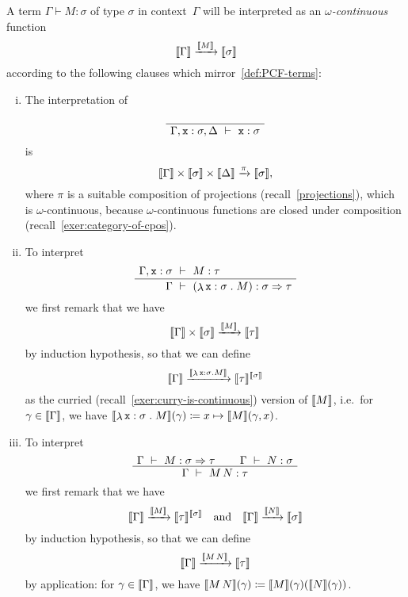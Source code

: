 \begin{definition}
  A term \(\Gamma \vdash M : \sigma\) of type \(\sigma\) in context~\(\Gamma\)
  will be interpreted as an \emph{\(\omega\)-continuous} function
  \[
    \llbracket\Gamma\rrbracket \xrightarrow{\llbracket M\rrbracket} \llbracket\sigma\rrbracket
  \]
  according to the following clauses which mirror~\cref{def:PCF-terms}:
  \begin{enumerate}[(i)]
  \item
    The interpretation of
    \[
      \def\fCenter{\ \vdash\ }
      \AxiomC{\phantom{$\fCenter$}}
      \UnaryInf$\Gamma,\var{x}:\sigma,\Delta \fCenter \var{x} : \sigma$
      \DisplayProof
    \]
    is
    \[
      \llbracket\Gamma\rrbracket \times \llbracket\sigma\rrbracket \times {\llbracket\Delta\rrbracket}
      \xrightarrow{\pi} \llbracket\sigma\rrbracket,
    \]
    where \(\pi\) is a suitable composition of projections
    (recall~\cref{projections}), which is \(\omega\)-continuous, because
    \(\omega\)-continuous functions are closed under composition
    (recall~\cref{exer:category-of-cpos}).
  \item
    To interpret
    \[
      \def\fCenter{\ \vdash\ }
      \Axiom$\Gamma , \var{x} : \sigma \fCenter M : \tau$
      \UnaryInf$\Gamma \fCenter (\lambdadot{\var{x} : \sigma}{M}) : \sigma
      \pcffun \tau$ \DisplayProof
    \]
    we first remark that we have
    \[
      \llbracket\Gamma\rrbracket \times \llbracket\sigma\rrbracket \xrightarrow{\llbracket M\rrbracket} \llbracket\tau\rrbracket
    \]
    by induction hypothesis, so that we can define
    \[
      \llbracket\Gamma\rrbracket \xrightarrow{\llbracket\mathop{\lambda}{\texttt x : \sigma}\mathrel{.}M\rrbracket}
      \llbracket\tau\rrbracket^{\llbracket\sigma\rrbracket}
    \]
    as the curried (recall~\cref{exer:curry-is-continuous}) version of
    \(\llbracket M\rrbracket\), i.e.\ for \(\gamma \in \llbracket\Gamma\rrbracket\), we have
    \(\llbracket\mathop{\lambda}{\texttt x : \sigma}\mathrel{.}M\rrbracket(\gamma) \coloneqq x \mapsto
    \llbracket M\rrbracket(\gamma,x)\).
  \item
    To interpret
    \[
      \def\fCenter{\ \vdash\ }
      \Axiom$\Gamma \fCenter M : \sigma \pcffun \tau$
      \Axiom$\Gamma \fCenter N : \sigma$
      \BinaryInf$\Gamma \fCenter M \, N : \tau$
      \DisplayProof
    \]
    we first remark that we have
    \[
      \llbracket\Gamma\rrbracket \xrightarrow{\llbracket M\rrbracket} \llbracket\tau\rrbracket^{\llbracket\sigma\rrbracket}
      \quad\text{and}\quad
      \llbracket\Gamma\rrbracket \xrightarrow{\llbracket N\rrbracket} \llbracket\sigma\rrbracket
    \]
    by induction hypothesis, so that we can define
    \[
      \llbracket\Gamma\rrbracket \xrightarrow{\llbracket M \, N\rrbracket} \llbracket\tau\rrbracket
    \]
    by application: for \(\gamma \in \llbracket\Gamma\rrbracket\), we have
    \(\densem{M \, N}(\gamma) \coloneqq
    \densem{M}(\gamma)\pa*{\densem{N}(\gamma)}\).


\end{enumerate}
\end{definition}
